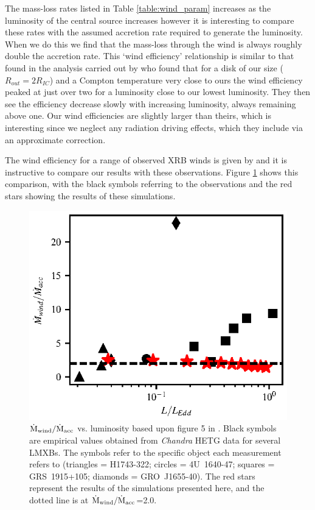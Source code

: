 \documentclass[a4paper,fleqn,usenatbib]{mnras}
\begin{document}
The mass-loss rates listed in Table \ref{table:wind_param} 
increases as the luminosity of the central source increases however it is interesting to compare
these rates with the assumed accretion rate required to generate the luminosity. When we do 
this we find that the mass-loss through the wind is always roughly double the accretion rate.
This `wind efficiency' relationship is similar to that found in the analysis carried out by \cite{2018MNRAS.473..838D}
who found that for a disk of our size ($R_{out}=2R_{IC}$) and a Compton temperature
very close to ours the wind efficiency peaked at just over two for a luminosity close to our lowest luminosity.
They then see the efficiency decrease slowly with increasing luminosity, 
always remaining above one. Our wind efficiencies are slightly larger than theirs, which is interesting since
we neglect any radiation driving effects, which they include via an approximate correction. 

The wind efficiency for a range of observed XRB winds is given by \cite{2012MNRAS.422L..11P} and
it is instructive to compare our results with these observations. Figure \ref{figure:mdot_vs_lum} shows 
this comparison, with the black symbols referring to the observations and the red stars showing the
results of these simulations. 

\begin{figure}
\includegraphics[width=\columnwidth]{figures/ponti.eps}
\caption{$\rm{\dot{M}_{wind}/\dot{M}_{acc}}$ vs. luminosity based upon figure 5 in \citet{2012MNRAS.422L..11P}. 
Black symbols are empirical values obtained from {\em Chandra} HETG data for several LMXBs. 
The symbols refer to the specific object each measurement refers to 
(triangles = H1743-322; circles = 4U~1640-47; squares = GRS~1915+105; diamonds = GRO~J1655-40). 
The red stars represent the results of the simulations presented here, and the dotted line
is at $\rm{\dot{M}_{wind}/\dot{M}_{acc}}$=2.0.}
\label{figure:mdot_vs_lum}
\end{figure}
\end{document}
